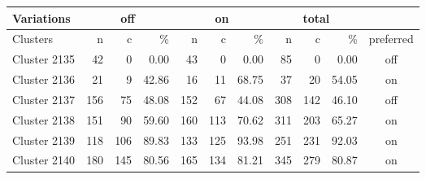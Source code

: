 \begin{tabular}{| l |  rrr| rrr| rrr| c|}
\hline
 Variations & \multicolumn{3}{|c|}{off} & \multicolumn{3}{|c|}{on} & \multicolumn{3}{|c|}{total} & \\
\hline
 Clusters & n & c & \% & n & c & \% & n & c & \% & preferred \\
\hline
Cluster 2135 & 42 & 0 & 0.00 & 43 & 0 & 0.00 & 85 & 0 & 0.00 & off \\
Cluster 2136 & 21 & 9 & 42.86 & 16 & 11 & 68.75 & 37 & 20 & 54.05 & on \\
Cluster 2137 & 156 & 75 & 48.08 & 152 & 67 & 44.08 & 308 & 142 & 46.10 & off \\
Cluster 2138 & 151 & 90 & 59.60 & 160 & 113 & 70.62 & 311 & 203 & 65.27 & on \\
Cluster 2139 & 118 & 106 & 89.83 & 133 & 125 & 93.98 & 251 & 231 & 92.03 & on \\
Cluster 2140 & 180 & 145 & 80.56 & 165 & 134 & 81.21 & 345 & 279 & 80.87 & on \\
\hline
\end{tabular}
